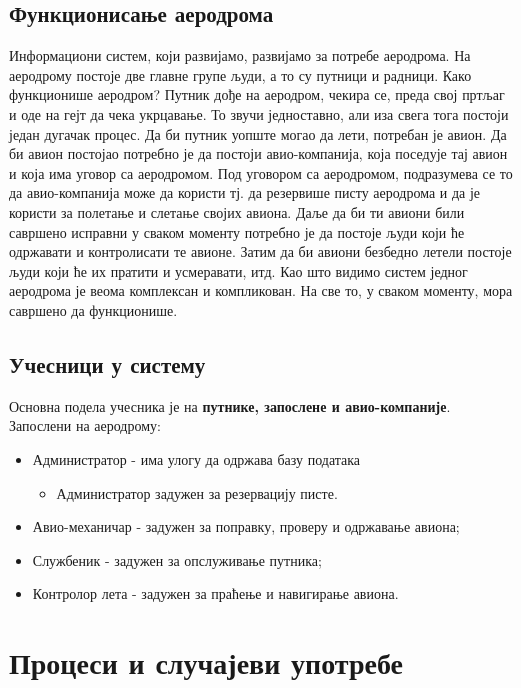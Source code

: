 \documentclass{article}
\begin{document}
\subsection{Функционисање аеродрома}
Информациони систем, који развијамо, развијамо за потребе аеродрома. На аеродрому постоје две главне групе људи, а то су путници и радници. Како функционише аеродром? Путник дође на аеродром, чекира се, преда свој пртљаг и оде на гејт да чека укрцавање. То звучи једноставно, али иза свега тога постоји један дугачак процес. Да би путник уопште могао да лети, потребан је авион. Да би авион постојао потребно је да постоји авио-компанија, која поседује тај авион и која има уговор са аеродромом. Под уговором са аеродромом, подразумева се то да авио-компанија може да користи тј. да резервише писту аеродрома и да је користи за полетање и слетање својих авиона. Даље да би ти авиони били савршено исправни у сваком моменту потребно је да постоје људи који ће одржавати и контролисати те авионе. Затим да би авиони безбедно летели постоје људи који ће их пратити и усмеравати, итд. Као што видимо систем једног аеродрома је веома комплексан и компликован. На све то, у сваком моменту, мора савршено да функционише.

\subsection{Учесници у систему}
Основна подела учесника је на \textbf{путнике, запослене и авио-компаније}.\\
Запослени на аеродрому:
\begin{itemize}
    \item Администратор - има улогу да одржава базу података
        \begin{itemize}
            \item Администратор задужен за резервацију писте.
        \end{itemize}
    \item Авио-механичар - задужен за поправку, проверу и одржавање авиона;
    \item Службеник - задужен за опслуживање путника;
    \item Контролор лета - задужен за праћење и навигирање авиона.
\end{itemize}

\section{Процеси и случајеви употребе}
\end{document}
